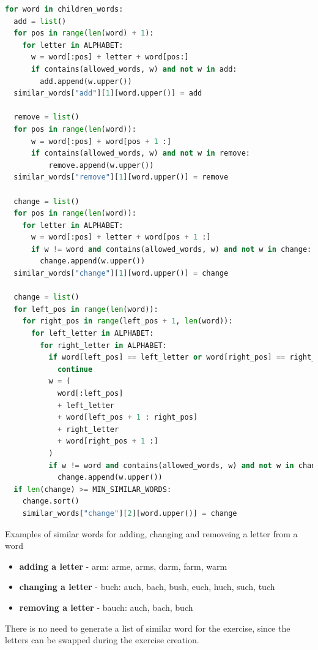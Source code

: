 \begin{lstlisting}[language=Python,caption={Algorithm to generate a list of similar words},label={lst:similarWords}]
for word in children_words:
  add = list()
  for pos in range(len(word) + 1):
    for letter in ALPHABET:
      w = word[:pos] + letter + word[pos:]
      if contains(allowed_words, w) and not w in add:
        add.append(w.upper())
  similar_words["add"][1][word.upper()] = add

  remove = list()
  for pos in range(len(word)):
      w = word[:pos] + word[pos + 1 :]
      if contains(allowed_words, w) and not w in remove:
          remove.append(w.upper())
  similar_words["remove"][1][word.upper()] = remove

  change = list()
  for pos in range(len(word)):
    for letter in ALPHABET:
      w = word[:pos] + letter + word[pos + 1 :]
      if w != word and contains(allowed_words, w) and not w in change:
        change.append(w.upper())
  similar_words["change"][1][word.upper()] = change

  change = list()
  for left_pos in range(len(word)):
    for right_pos in range(left_pos + 1, len(word)):
      for left_letter in ALPHABET:
        for right_letter in ALPHABET:
          if word[left_pos] == left_letter or word[right_pos] == right_letter:
            continue
          w = (
            word[:left_pos]
            + left_letter
            + word[left_pos + 1 : right_pos]
            + right_letter
            + word[right_pos + 1 :]
          )
          if w != word and contains(allowed_words, w) and not w in change:
            change.append(w.upper())
  if len(change) >= MIN_SIMILAR_WORDS:
    change.sort()
    similar_words["change"][2][word.upper()] = change
\end{lstlisting}

\begin{example}
  Examples of similar words for adding, changing and removeing a letter from a word
  \begin{itemize}
    \item \textbf{adding a letter} - arm: arme, arms, darm, farm, warm
    \item \textbf{changing a letter} - buch: auch, bach, bush, euch, huch, such, tuch
    \item \textbf{removing a letter} - bauch: auch, bach, buch
  \end{itemize}
\end{example}

There is no need to generate a list of similar word for the  exercise, since the letters can be swapped during the exercise creation.

